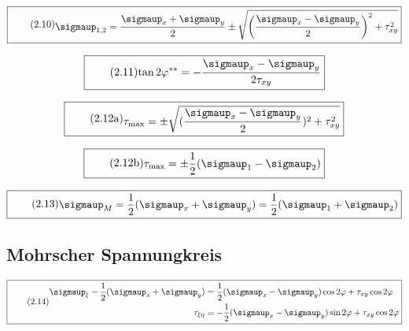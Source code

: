 \documentclass[11pt]{article}
\newcommand{\1}{ {\mathds{1}} }
\renewcommand{\sigma  }{\sigmaup   }
\begin{document}
		\begin{equation}
			\boxed{
				\tag{2.10}
				\begin{split}
					\sigma_{1,2}
					=
					\frac{\sigma_x + \sigma_y}{2}
					\pm
					\sqrt{\left(
						\frac{\sigma_x - \sigma_y}{2}
						\right)^2
						+
						\tau_{xy}^2
					}
				\end{split}
			}
		\end{equation}

		\begin{equation}
			\boxed{
				\tag{2.11}
				\begin{split}
					\tan 2\varphi^{\ast\ast}
					=
					-\frac{\sigma_x - \sigma_y}{2 \tau_{xy}}
				\end{split}
			}
		\end{equation}

		\begin{equation}
			\boxed{
				\tag{2.12a}
				\begin{split}
					\tau_{\text{max}}
					=
					\pm
					\sqrt{(\frac{\sigma_x - \sigma_y}{2})^2 + \tau_{xy}^2}
				\end{split}
			}
		\end{equation}

		\begin{equation}
			\boxed{
				\tag{2.12b}
				\begin{split}
					\tau_{\text{max}}
					=
					\pm
					\frac{1}{2}(\sigma_1 -\sigma_2)
				\end{split}
			}
		\end{equation}

		\begin{equation}
			\boxed{
				\tag{2.13}
				\begin{split}
					\sigma_M
					=
					\frac{1}{2}(\sigma_x + \sigma_y)
					=
					\frac{1}{2}(\sigma_1 + \sigma_2)
				\end{split}
			}
		\end{equation}

		\subsection{Mohrscher Spannungkreis}

		\begin{equation}
			\boxed{
				\tag{2.14}
				\begin{split}
					\sigma_\xi-\frac{1}{2}(\sigma_x + \sigma_y)
					&=
					\frac{1}{2}(\sigma_x -\sigma_y)\cos 2\varphi + \tau_{xy}\cos 2 \varphi\\
					\tau_{\xi\eta}
					&=
					- \frac{1}{2}(\sigma_x - \sigma_y) \sin 2 \varphi + \tau_{xy} \cos 2\varphi
				\end{split}
			}
		\end{equation}		
\end{document}
